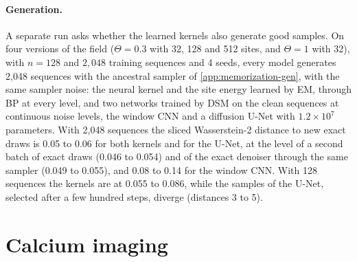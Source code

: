 \documentclass{article}
\begin{document}
\begin{table}[!htbp]
  \caption{Allen--Cahn field: excess DSM loss ($\times10^{-3}$) from 2{,}048 training sequences, medians over 8 seeds, the
  same seeds, training sequences and test sequences for every model. Kernels: learned by EM from noisy sequences, used
  inside BP. Networks: DSM on the clean sequences. Last row: the Bayes loss itself.}
  \label{tab:field}
  \centering
  \small
  \setlength{\tabcolsep}{3.5pt}
  
\end{table}

\paragraph{Generation.} A separate run asks whether the learned kernels also generate good samples. On four versions
of the field ($\Theta=0.3$ with 32, 128 and 512 sites, and $\Theta=1$ with 32), with $n=128$ and $2{,}048$ training
sequences and 4 seeds, every model generates 2{,}048 sequences with the ancestral sampler of
\cref{app:memorization-gen}, with the same sampler noise: the neural kernel and the site energy learned by EM, through
BP at every level, and two networks trained by DSM on the clean sequences at continuous noise levels, the window CNN
and a diffusion U-Net with $1.2\times10^{7}$ parameters. With 2{,}048 sequences the sliced Wasserstein-2 distance to new
exact draws is 0.05 to 0.06 for both kernels and for the U-Net, at the level of a second batch of exact draws (0.046 to
0.054) and of the exact denoiser through the same sampler (0.049 to 0.055), and 0.08 to 0.14 for the window CNN. With 128
sequences the kernels are at 0.055 to 0.086, while the samples of the U-Net, selected after a few hundred steps, diverge
(distances 3 to 5).

\section{Calcium imaging}
\label{app:calcium}
\end{document}
